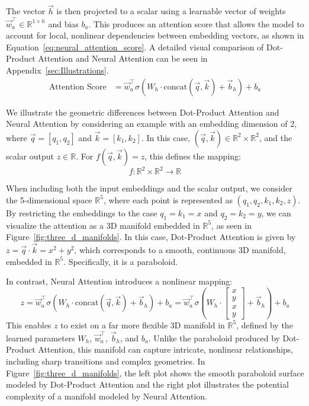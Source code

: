 \documentclass{article}
\begin{document}
The vector $\vec{h}$ is then projected to a scalar using a learnable vector of weights $\vec{w}_a^\top \in \mathbb{R}^{1 \times h}$ and bias $b_a$. This produces an attention score that allows the model to account for local, nonlinear dependencies between embedding vectors, as shown in Equation~\ref{eq:neural_attention_score}. A detailed visual comparison of Dot-Product Attention and Neural Attention can be seen in Appendix~\ref{sec:Illustrations}.
\begin{align}
    \text{Attention Score} &= \vec{w}_a^\top \sigma\left(\mathit{W_h} \cdot \text{concat}(\vec{q}, \vec{k}) + \vec{b}_h\right) + b_a \label{eq:neural_attention_score}
\end{align}

We illustrate the geometric differences between Dot-Product Attention and Neural Attention by considering an example with an embedding dimension of 2, where $\vec{q} = [q_1, q_2]$ and $\vec{k} = [k_1, k_2]$. In this case, \((\vec{q}, \vec{k}) \in \mathbb{R}^2 \times \mathbb{R}^2\), and the scalar output \(z \in \mathbb{R}\). For $f(\vec{q},\vec{k})=z$, this defines the mapping:
\[
f: \mathbb{R}^2 \times \mathbb{R}^2 \to \mathbb{R}
\]

When including both the input embeddings and the scalar output, we consider the 5-dimensional space \(\mathbb{R}^5\), where each point is represented as \((q_1, q_2, k_1, k_2, z)\). By restricting the embeddings to the case \(q_1 = k_1 = x\) and \(q_2 = k_2 = y\), we can visualize the attention as a 3D manifold embedded in \(\mathbb{R}^5\), as seen in Figure~\ref{fig:three_d_manifolds}. In this case, Dot-Product Attention is given by $z = \vec{q} \cdot \vec{k} = x^2 + y^2$, which corresponds to a smooth, continuous 3D manifold, embedded in \(\mathbb{R}^5\). Specifically, it is a paraboloid.

In contrast, Neural Attention introduces a nonlinear mapping:
\[
z = \vec{w}_a^\top \sigma\left(\mathit{W_h} \cdot 
\text{concat}(\vec{q}, \vec{k})
+ \vec{b}_h
\right)
+ b_a
=
\vec{w}_a^\top \sigma\left(\mathit{W_h} \cdot 
\begin{bmatrix}
x \\
y \\
x \\
y
\end{bmatrix}
+ \vec{b}_h
\right)
+ b_a
\]
This enables \(z\) to exist on a far more flexible 3D manifold in \(\mathbb{R}^5\), defined by the learned parameters \(\mathit{W_h}\), $\vec{w}_a^\top$, $\vec{b}_h$, and $b_a$. Unlike the paraboloid produced by Dot-Product Attention, this manifold can capture intricate, nonlinear relationships, including sharp transitions and complex geometries. In Figure~\ref{fig:three_d_manifolds}, the left plot shows the smooth paraboloid surface modeled by Dot-Product Attention and the right plot illustrates the potential complexity of a manifold modeled by Neural Attention.
\end{document}
